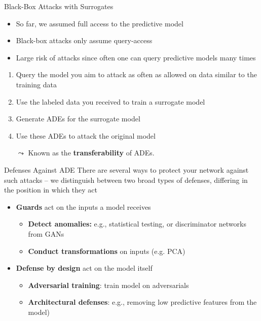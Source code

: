 \documentclass[11pt,compress,t,notes=noshow, aspectratio=169, xcolor=table]{beamer}
\begin{document}
\begin{vbframe}[c]{Black-Box Attacks with Surrogates }

\begin{itemize}
    \item So far, we assumed full access to the predictive model
    \item Black-box attacks only assume query-access
    \item Large risk of attacks since often one can query predictive models many times
\end{itemize}

\medskip
\begin{enumerate}
    \item Query the model you aim to attack as often as allowed on data similar to the training data
    \item Use the labeled data you received to train a surrogate model
    \item Generate ADEs for the surrogate model
    \item Use these ADEs to attack the original model
\end{enumerate}

\medskip
\begin{itemize}
    \item[$\leadsto$] Known as the \textbf{transferability} of ADEs.
\end{itemize}



\end{vbframe}

\begin{vbframe}[c]{Defenses Against ADE}
There are several ways to protect your network against such attacks -- we distinguish between two broad types of defenses, differing in the position in which they act
\begin{itemize}
    \item \textbf{Guards} act on the inputs a model receives
    \begin{itemize}
        \item \textbf{Detect anomalies:} e.g., statistical testing, or discriminator networks from GANs
        \item \textbf{Conduct transformations} on inputs (e.g. PCA)
    \end{itemize}
    \item \textbf{Defense by design} act on the model itself
    \begin{itemize}
        \item \textbf{Adversarial training}: train model on adversarials
        \item \textbf{Architectural defenses}: e.g., removing low predictive features from the model)
    \end{itemize}
\end{itemize}
\end{vbframe}
\end{document}
